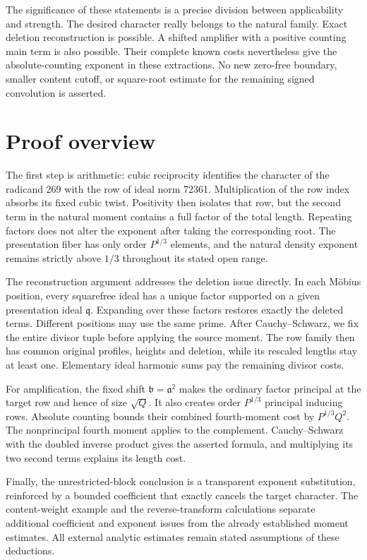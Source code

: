 \documentclass[11pt]{article}
\theoremstyle{remark}\newtheorem{remark}[theorem]{Remark}
\begin{document}
The significance of these statements is a precise division between applicability and strength. The desired character really belongs to the natural family. Exact deletion reconstruction is possible. A shifted amplifier with a positive counting main term is also possible. Their complete known costs nevertheless give the absolute-counting exponent in these extractions. No new zero-free boundary, smaller content cutoff, or square-root estimate for the remaining signed convolution is asserted.

\section{Proof overview}

The first step is arithmetic: cubic reciprocity identifies the character of the radicand 269 with the row of ideal norm 72361. Multiplication of the row index absorbs its fixed cubic twist. Positivity then isolates that row, but the second term in the natural moment contains a full factor of the total length. Repeating factors does not alter the exponent after taking the corresponding root. The presentation fiber has only order $P^{1/3}$ elements, and the natural density exponent remains strictly above $1/3$ throughout its stated open range.

The reconstruction argument addresses the deletion issue directly. In each Möbius position, every squarefree ideal has a unique factor supported on a given presentation ideal $\mathfrak q$. Expanding over these factors restores exactly the deleted terms. Different positions may use the same prime. After Cauchy--Schwarz, we fix the entire divisor tuple before applying the source moment. The row family then has common original profiles, heights and deletion, while its rescaled lengths stay at least one. Elementary ideal harmonic sums pay the remaining divisor costs.

For amplification, the fixed shift $\mathfrak b=\mathfrak a^2$ makes the ordinary factor principal at the target row and hence of size $\sqrt Q$. It also creates order $P^{1/3}$ principal inducing rows. Absolute counting bounds their combined fourth-moment cost by $P^{1/3}Q^2$. The nonprincipal fourth moment applies to the complement. Cauchy--Schwarz with the doubled inverse product gives the asserted formula, and multiplying its two second terms explains its length cost.

Finally, the unrestricted-block conclusion is a transparent exponent substitution, reinforced by a bounded coefficient that exactly cancels the target character. The content-weight example and the reverse-transform calculations separate additional coefficient and exponent issues from the already established moment estimates. All external analytic estimates remain stated assumptions of these deductions.
\end{document}
